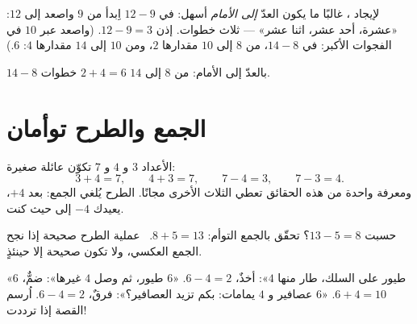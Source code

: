 \begin{method}\label{met:g1:subtraction:countup}
لإيجاد ، غالبًا ما يكون العدّ \emph{إلى الأمام} أسهل:
في $12 - 9$ اِبدأ من $9$ واصعد إلى $12$: «عشرة، أحد عشر، اثنا
عشر» --- ثلاث خطوات. إذن $12 - 9 = 3$. (واصعد عبر $10$ في الفجوات
الأكبر: في $14 - 8$، من $8$ إلى $10$ مقدارها $2$، ومن $10$ إلى $14$
مقدارها $4$:  $6$.)
\end{method}

\begin{omfigure}

{\small $14 - 8$ بالعدّ إلى الأمام: من $8$ إلى $14$
$2 + 4 = 6$ خطوات.}
\end{omfigure}

\section{الجمع والطرح توأمان}

\begin{example}\label{ex:g1:subtraction:family}
الأعداد $3$ و $4$ و $7$ تكوّن عائلة صغيرة:
\[
3 + 4 = 7, \qquad
4 + 3 = 7, \qquad
7 - 4 = 3, \qquad
7 - 3 = 4 .
\]
ومعرفة واحدة من هذه الحقائق تعطي الثلاث الأخرى مجانًا. الطرح يُلغي
الجمع: بعد $+4$، يعيدك $-4$ إلى حيث كنت.
\end{example}

\begin{example}[التحقّق]\label{ex:g1:subtraction:check}
حسبت $13 - 5 = 8$؟ تحقّق بالجمع التوأم:
$8 + 5 = 13$. \checkmark\ عملية الطرح صحيحة إذا نجح الجمع
العكسي، ولا تكون صحيحة إلا حينئذٍ.
\end{example}

\begin{example}[أي عملية؟]\label{ex:g1:subtraction:choose}
«$6$ طيور على السلك، طار منها $4$»: أخذٌ، $6 - 4 = 2$.
«$6$ طيور، ثم وصل $4$ غيرها»: ضمٌّ، $6 + 4 = 10$.
«$6$ عصافير و $4$ يمامات: بكم تزيد العصافير؟»:
فرقٌ، $6 - 4 = 2$. اُرسم القصة إذا ترددت!
\end{example}


